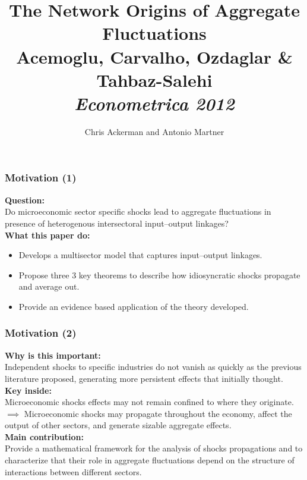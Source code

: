 \documentclass[dvipsnames]{beamer}
\title{The Network Origins of Aggregate Fluctuations\\
  Acemoglu, Carvalho, Ozdaglar \& Tahbaz-Salehi\\
  \emph{Econometrica 2012}
}
\author{Chris Ackerman and Antonio Martner}
\begin{document}
\maketitle

\begin{frame}
\frametitle{Motivation (1)}
\justifying

{\bf Question:}\\
Do microeconomic sector specific shocks lead to aggregate fluctuations in 
presence of heterogenous intersectoral input–output linkages?\\
\vspace{0.5cm}
{\bf What this paper do:}
\begin{itemize}
  \item Develops a multisector model that captures input–output linkages.
  \item Propose three 3 key theorems to describe how idiosyncratic shocks propagate
  and average out.
  \item Provide an evidence based application of the theory developed.
\end{itemize}

\end{frame}
\begin{frame}
    \frametitle{Motivation (2)}
    \justifying
    {\bf Why is this important:}\\
    Independent shocks to specific industries do not vanish as quickly as the
    previous literature proposed, generating more persistent effects that initially
    thought.\\
\vspace{0.5cm}
{\bf Key inside:}\\
Microeconomic shocks effects may not remain confined
to where they originate.\\
$\implies$ Microeconomic shocks may propagate
throughout the economy, affect the output of other sectors, and generate sizable
aggregate effects.\\
\vspace{0.5cm}
    {\bf Main contribution:}\\
    Provide a mathematical
    framework for the analysis of shocks propagations and to characterize
    that their role in aggregate fluctuations depend on the structure of 
    interactions between different sectors.
    
    \end{frame}
\end{document}
